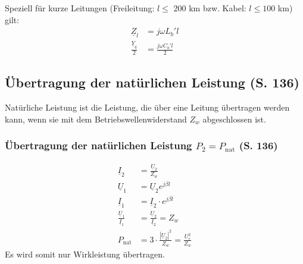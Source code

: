 \documentclass[a4paper,twocolumn,10pt]{article}
\begin{document}
Speziell für kurze Leitungen (Freileitung: $l\leq$ 200 km bzw. Kabel: $l\leq 100$ km) gilt:
\begin{equation*}
\begin{split}
\underline{Z}_l&=j\omega L_b'l\\
\frac{\underline{Y}_q}{2}&=\frac{j\omega C_b'l}{2}
\end{split}
\end{equation*}

\subsection{Übertragung der natürlichen Leistung (S. 136)}
Natürliche Leistung ist die Leistung, die über eine Leitung übertragen werden kann, wenn sie mit dem Betriebswellenwiderstand $Z_w$ abgeschlossen ist.

\subsubsection{Übertragung der natürlichen Leistung $P_2=P_{\text{nat}}$ (S. 136)}
\begin{equation*}
\begin{split}
\underline{I}_2&=\frac{\underline{U}_2}{Z_w}\\
\underline{U}_1&=\underline{U}_2e^{j\beta l}\\
\underline{I}_1&=\underline{I}_2\cdot e^{j\beta l}\\
\frac{\underline{U}_1}{\underline{I}_1}&=\frac{\underline{U}_2}{\underline{I}_2}=Z_w\\
P_{\text{nat}}&=3\cdot\frac{|\underline{U}_2|^2}{Z_w}=\frac{U_r^2}{Z_w}
\end{split}
\end{equation*}
Es wird somit nur Wirkleistung übertragen.
\end{document}
